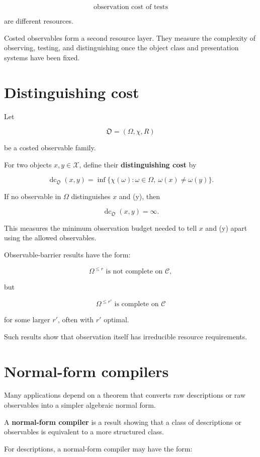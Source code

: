 \documentclass[11pt]{article}
\begin{document}
\[
\text{observation cost of tests}
\]

are different resources.

Costed observables form a second resource layer. They measure the complexity of observing, testing, and distinguishing once the object class and presentation systems have been fixed.


\section{Distinguishing cost}

Let

\[
\mathfrak O=(\Omega,\chi,R)
\]

be a costed observable family.

For two objects \(x,y\in\mathcal X\), define their \textbf{distinguishing cost} by

\[
\operatorname{dc}_{\mathfrak O}(x,y)=\inf\{\chi(\omega):\omega\in\Omega,\ \omega(x)\neq\omega(y)\}.
\]

If no observable in \(\Omega\) distinguishes \(x\) and (y), then

\[
\operatorname{dc}_{\mathfrak O}(x,y)=\infty.
\]

This measures the minimum observation budget needed to tell \(x\) and (y) apart using the allowed observables.

Observable-barrier results have the form:

\[
\Omega^{\leq r}\text{ is not complete on }\mathcal C,
\]

but

\[
\Omega^{\leq r'}\text{ is complete on }\mathcal C
\]

for some larger \(r'\), often with \(r'\) optimal.

Such results show that observation itself has irreducible resource requirements.


\section{Normal-form compilers}

Many applications depend on a theorem that converts raw descriptions or raw observables into a simpler algebraic normal form.

A \textbf{normal-form compiler} is a result showing that a class of descriptions or observables is equivalent to a more structured class.

For descriptions, a normal-form compiler may have the form:
\end{document}
